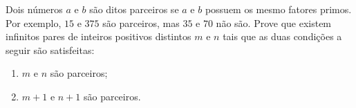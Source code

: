 Dois números $a$ e $b$ são ditos parceiros se $a$ e $b$ possuem os mesmo fatores primos.
Por exemplo, $15$ e $375$ são parceiros, mas $35$ e $70$ não são.
Prove que existem infinitos pares de inteiros positivos distintos $m$ e $n$ tais que as duas condições a seguir são satisfeitas:

\begin{enumerate}[label = (\roman*)]
	\item $m$ e $n$ são parceiros;
	\item $m + 1$ e $n + 1$ são parceiros.
\end{enumerate}
